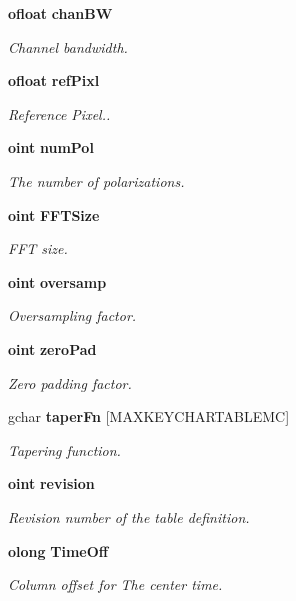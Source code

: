 \begin{CompactItemize}
{\bf ofloat} {\bf chan\-BW}
\begin{CompactList}\small\item\em Channel bandwidth. \item\end{CompactList}\item 
{\bf ofloat} {\bf ref\-Pixl}
\begin{CompactList}\small\item\em Reference Pixel.. \item\end{CompactList}\item 
{\bf oint} {\bf num\-Pol}
\begin{CompactList}\small\item\em The number of polarizations. \item\end{CompactList}\item 
{\bf oint} {\bf FFTSize}
\begin{CompactList}\small\item\em FFT size. \item\end{CompactList}\item 
{\bf oint} {\bf oversamp}
\begin{CompactList}\small\item\em Oversampling factor. \item\end{CompactList}\item 
{\bf oint} {\bf zero\-Pad}
\begin{CompactList}\small\item\em Zero padding factor. \item\end{CompactList}\item 
gchar {\bf taper\-Fn} [MAXKEYCHARTABLEMC]
\begin{CompactList}\small\item\em Tapering function. \item\end{CompactList}\item 
{\bf oint} {\bf revision}
\begin{CompactList}\small\item\em Revision number of the table definition. \item\end{CompactList}\item 
{\bf olong} {\bf Time\-Off}
\begin{CompactList}\small\item\em Column offset for The center time. \item\end{CompactList}\item 

\end{CompactItemize}
